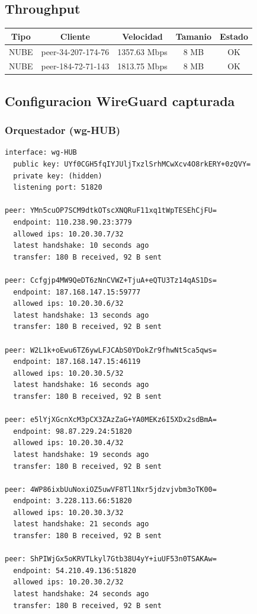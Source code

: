 \documentclass[11pt,a4paper]{article}
\begin{document}
\subsection{Throughput}
\begin{longtable}{|c|c|c|c|c|}
\hline
Tipo & Cliente & Velocidad & Tamanio & Estado \\ \hline
NUBE & peer-34-207-174-76 & 1357.63 Mbps & 8 MB & OK \\ \hline
NUBE & peer-184-72-71-143 & 1813.75 Mbps & 8 MB & OK \\ \hline
\end{longtable}

\subsection{Configuracion WireGuard capturada}
\subsubsection*{Orquestador (wg-HUB)}
\begin{lstlisting}
interface: wg-HUB
  public key: UYf0CGH5fqIYJUljTxzlSrhMCwXcv4O8rkERY+0zQVY=
  private key: (hidden)
  listening port: 51820

peer: YMn5cuOP7SCM9dtkOTscXNQRuF11xq1tWpTESEhCjFU=
  endpoint: 110.238.90.23:3779
  allowed ips: 10.20.30.7/32
  latest handshake: 10 seconds ago
  transfer: 180 B received, 92 B sent

peer: Ccfgjp4MW9QeDT6zNnCVWZ+TjuA+eQTU3Tz14qAS1Ds=
  endpoint: 187.168.147.15:59777
  allowed ips: 10.20.30.6/32
  latest handshake: 13 seconds ago
  transfer: 180 B received, 92 B sent

peer: W2L1k+oEwu6TZ6ywLFJCAbS0YDokZr9fhwNt5ca5qws=
  endpoint: 187.168.147.15:46119
  allowed ips: 10.20.30.5/32
  latest handshake: 16 seconds ago
  transfer: 180 B received, 92 B sent

peer: e5lYjXGcnXcM3pCX3ZAzZaG+YA0MEKz6I5XDx2sdBmA=
  endpoint: 98.87.229.24:51820
  allowed ips: 10.20.30.4/32
  latest handshake: 19 seconds ago
  transfer: 180 B received, 92 B sent

peer: 4WP86ixbUuNoxiOZ5uwVF8Tl1Nxr5jdzvjvbm3oTK00=
  endpoint: 3.228.113.66:51820
  allowed ips: 10.20.30.3/32
  latest handshake: 21 seconds ago
  transfer: 180 B received, 92 B sent

peer: ShPIWjGx5oKRVTLkyl7Gtb38U4yY+iuUF53n0TSAKAw=
  endpoint: 54.210.49.136:51820
  allowed ips: 10.20.30.2/32
  latest handshake: 24 seconds ago
  transfer: 180 B received, 92 B sent

\end{lstlisting}
\end{document}
